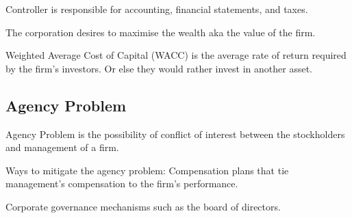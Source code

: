 Controller is responsible for accounting, financial statements, and taxes.

The corporation desires to maximise the wealth aka the value of the firm.

Weighted Average Cost of Capital (WACC) is the average rate of return required by the firm's investors. Or else they would rather invest in another asset.

\subsection{Agency Problem}

Agency Problem is the possibility of conflict of interest between the stockholders and management of a firm.

Ways to mitigate the agency problem:
Compensation plans that tie management's compensation to the firm's performance.

Corporate governance mechanisms such as the board of directors.


